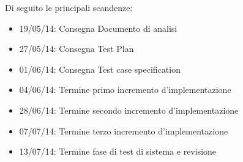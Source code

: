 Di seguito le principali scandenze:
\begin{itemize}
\item 19/05/14: Consegna Documento di analisi
\item 27/05/14: Consegna Test Plan
\item 01/06/14: Consegna Test case specification
\item 04/06/14: Termine primo incremento d'implementazione
\item 28/06/14: Termine secondo incremento d'implementazione
\item 07/07/14: Termine terzo incremento d'implementazione
\item 13/07/14: Termine fase di test di sistema e revisione
\end{itemize}
